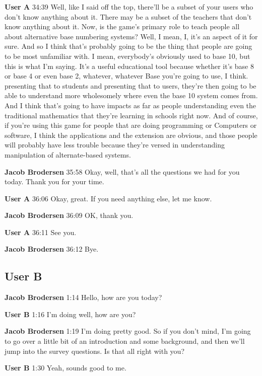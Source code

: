 \documentclass{article}
\begin{document}
\noindent \textbf{User A}   34:39
Well, like I said off the top, there'll be a subset of your users who don't know anything about it. There may be a subset of the teachers that don't know anything about it. Now, is the game's primary role to teach people all about alternative base numbering systems?
Well, I mean, I, it's an aspect of it for sure. And so I think that's probably going to be the thing that people are going to be most unfamiliar with. I mean, everybody's obviously used to base 10, but this is what I'm saying. It's a useful educational tool because whether it's base 8 or base 4 or even base 2, whatever, whatever
Base you're going to use, I think.
presenting that to students and presenting that to users, they're then going to be able to understand more wholesomely where even the base 10 system comes from. And I think that's going to have impacts as far as people understanding even the traditional mathematics that they're learning in schools right now. And of course, if you're using this game for people that are doing programming or
Computers or software, I think the applications and the extension are obvious, and those people will probably have less trouble because they're versed in understanding manipulation of alternate-based systems.

\noindent \textbf{Jacob Brodersen}   35:58
Okay, well, that's all the questions we had for you today. Thank you for your time.

\noindent \textbf{User A}   36:06
Okay, great. If you need anything else, let me know.

\noindent \textbf{Jacob Brodersen}   36:09
OK, thank you.

\noindent \textbf{User A}   36:11
See you.

\noindent \textbf{Jacob Brodersen}   36:12
Bye.

\subsection{User B}

\noindent \textbf{Jacob Brodersen}   1:14
Hello, how are you today?

\noindent \textbf{User B}   1:16
I'm doing well, how are you?

\noindent \textbf{Jacob Brodersen}   1:19
I'm doing pretty good. So if you don't mind, I'm going to go over a little bit of an introduction and some background, and then we'll jump into the survey questions. Is that all right with you?

\noindent \textbf{User B}   1:30
Yeah, sounds good to me.
\end{document}
